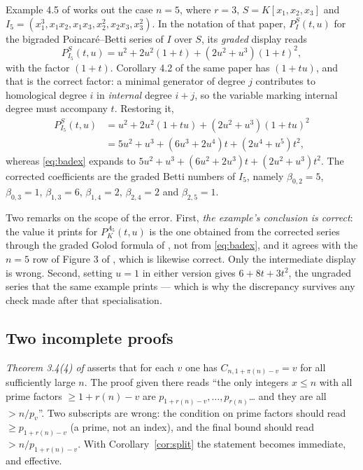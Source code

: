 \documentclass[a4paper,11pt,oneside,reqno]{amsart}
\theoremstyle{definition}
\theoremstyle{remark}
\theoremstyle{plain}
\begin{document}
Example 4.5 of \cite{Snellman2000} works out the case \(n = 5\), where \(r = 3\),
\(S = K[x_1,x_2,x_3]\) and
\(I_5 = (x_1^{3},x_1x_2,x_1x_3,x_2^{2},x_2x_3,x_3^{2})\). In the notation of that
paper, \(P^{S}_{I}(t,u)\) for the bigraded Poincaré--Betti series of \(I\) over
\(S\), its \emph{graded} display reads
\begin{equation}\label{eq:badex}
  P^{S}_{I_5}(t,u) = u^{2}+2u^{2}(1+t)+(2u^{2}+u^{3})(1+t)^{2},
\end{equation}
with the factor \((1+t)\). Corollary 4.2 of the same paper has \((1+tu)\), and
that is the correct factor: a minimal generator of degree \(j\) contributes to
homological degree \(i\) in \emph{internal} degree \(i+j\), so the variable
marking internal degree must accompany \(t\). Restoring it,
\begin{equation}\label{eq:goodex}
\begin{split}
  P^{S}_{I_5}(t,u) &= u^{2}+2u^{2}(1+tu)+(2u^{2}+u^{3})(1+tu)^{2}\\
    &= 5u^{2}+u^{3}+(6u^{3}+2u^{4})t+(2u^{4}+u^{5})t^{2},
\end{split}
\end{equation}
whereas \eqref{eq:badex} expands to
\(5u^{2}+u^{3}+(6u^{2}+2u^{3})t+(2u^{2}+u^{3})t^{2}\). The corrected
coefficients are the graded Betti numbers of \(I_5\), namely
\(\beta_{0,2} = 5\), \(\beta_{0,3} = 1\), \(\beta_{1,3} = 6\), \(\beta_{1,4} = 2\),
\(\beta_{2,4} = 2\) and \(\beta_{2,5} = 1\).

Two remarks on the scope of the error. First, \emph{the example's conclusion is
correct}: the value it prints for \(P^{A_5}_{K}(t,u)\) is the one obtained from
the corrected series through the graded Golod formula of
\cite[Cor.~4.4]{Snellman2000}, not from \eqref{eq:badex}, and it agrees with
the \(n = 5\) row of Figure 3 of \cite{Snellman2000}, which is likewise correct.
Only the intermediate display is wrong. Second, setting \(u = 1\) in either
version gives \(6+8t+3t^{2}\), the ungraded series that the same example
prints --- which is why the discrepancy survives any check made after that
specialisation.

\subsection{Two incomplete proofs}

\emph{Theorem 3.4(4) of \cite{Snellman2000}} asserts that for each \(v\) one has
\(C_{n,1+\pi(n)-v} = v\) for all sufficiently large \(n\). The proof given there
reads ``the only integers \(x \le n\) with all prime factors \(\ge 1+r(n)-v\) are
\(p_{1+r(n)-v},\dots,p_{r(n)}\)\dots{} and they are all \(>n/p_v\)''. Two
subscripts are wrong: the condition on prime factors should read
\(\ge p_{1+r(n)-v}\) (a prime, not an index), and the final bound should read
\(>n/p_{1+r(n)-v}\). With Corollary~\ref{cor:split} the statement becomes
immediate, and effective.
\end{document}
